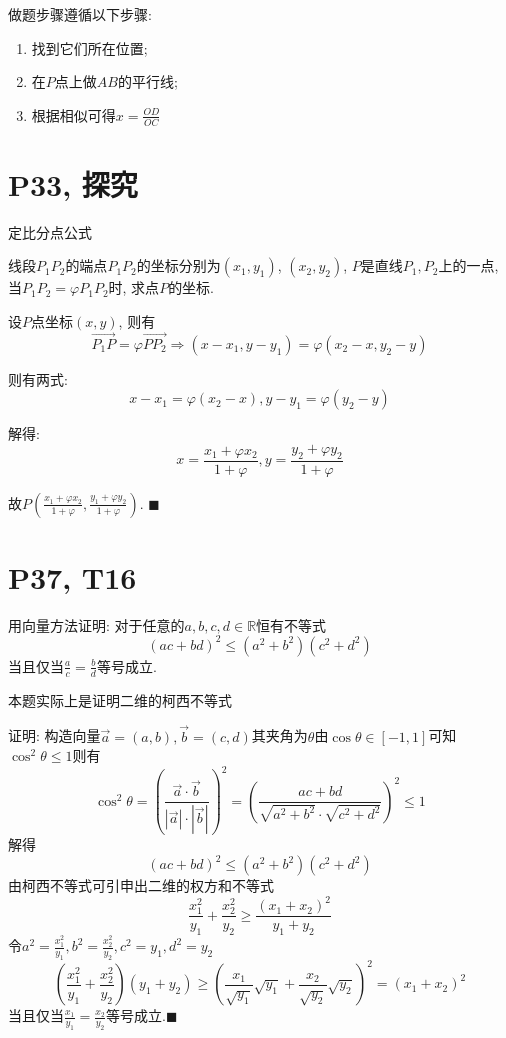 \documentclass{book}
\begin{document}
        做题步骤遵循以下步骤:
        \begin{enumerate}
            \item 找到它们所在位置;
            \item 在$P$点上做$AB$的平行线;
            \item 根据相似可得$\displaystyle x=\frac{OD}{OC}$
        \end{enumerate}

        \section{\textcolor[rgb]{0.11,0.65,0.52}{P33, 探究}}
        
        \begin{boxB}
            定比分点公式

            线段$P_1P_2$的端点$P_1P_2$的坐标分别为$(x_1,y_1)$, $(x_2,y_2)$, $P$是直线$P_1,P_2$上的一点, 当$P_1P_2=\varphi P_1P_2$时, 求点$P$的坐标.
        \end{boxB}
        设$P$点坐标$(x,y)$, 则有$$\overrightarrow{P_1P}=\varphi \overrightarrow{PP_2}\Longrightarrow (x-x_1,y-y_1)=\varphi(x_2-x, y_2-y)$$

        则有两式: $$x-x_1=\varphi (x_2-x),y-y_1=\varphi (y_2-y)$$

        解得:$$x=\frac{x_1+\varphi x_2}{1+\varphi},y=\frac{y_2+\varphi y_2}{1+\varphi}$$
        
        故$\displaystyle P(\frac{x_1+\varphi x_2}{1+\varphi},\frac{y_1+\varphi y_2}{1+\varphi})$. $\blacksquare$

        \section{\textcolor[rgb]{0.11,0.65,0.52}{P37, T16}}
        \begin{boxB}
            用向量方法证明: 对于任意的$a,b,c,d \in \mathbb{R}$恒有不等式$$(ac+bd)^2\le(a^2+b^2)(c^2+d^2)$$
            当且仅当$\displaystyle \frac{a}{c}=\frac{b}{d}$等号成立.
        \end{boxB}

        本题实际上是证明\textcolor[rgb]{0.38,0.11,0.2}{二维的柯西不等式}

        证明: 构造向量$\overrightarrow{a}=(a,b),\overrightarrow{b}=(c,d)$其夹角为$\theta$由$\cos \theta \in [-1,1]$可知$\cos ^2 \theta \le 1$则有$$\cos ^2 \theta=\left (\frac{\overrightarrow{a}\cdot \overrightarrow{b}}{|\overrightarrow{a}|\cdot |\overrightarrow{b}|}\right ) ^2=\left ( \frac{ac+bd}{\sqrt{a^2+b^2}\cdot \sqrt{c^2+d^2}} \right )^2 \le 1$$
        解得$$(ac+bd)^2 \le (a^2+b^2)(c^2+d^2)$$
        由\textcolor[rgb]{0.38,0.11,0.2}{柯西不等式}可引申出\textcolor[rgb]{0.38,0.11,0.2}{二维的权方和不等式}$$\frac{x_1^2}{y_1}+\frac{x_2^2}{y_2}\ge \frac{(x_1+x_2)^2}{y_1+y_2}$$
        令$\displaystyle a^2=\frac{x_1^2}{y_1},b^2=\frac{x_2^2}{y_2},c^2=y_1,d^2=y_2$
        $$\left ( \frac{x_1^2}{y_1}+\frac{x_2^2}{y_2} \right )(y_1+y_2)\ge \left ( \frac{x_1}{\sqrt{y_1}}\sqrt{y_1}+\frac{x_2}{\sqrt{y_2}}\sqrt{y_2} \right )^2=(x_1+x_2)^2$$
        当且仅当$\displaystyle \frac{x_1}{y_1}=\frac{x_2}{y_2}$等号成立.$\blacksquare$
\end{document}
